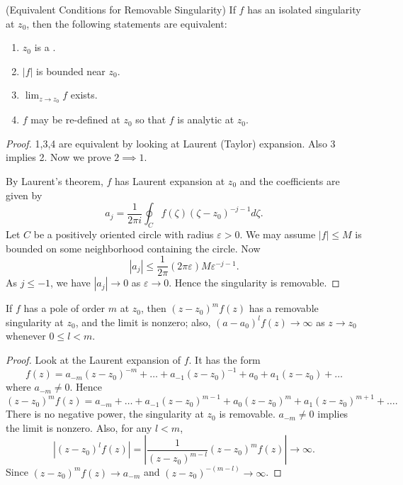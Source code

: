 \begin{theorem}(Equivalent Conditions for Removable Singularity)
	If $f$ has an isolated singularity at $z_0$, then the following statements are equivalent:
	\begin{enumerate}
		\item $z_0$ is a .
		\item $|f|$ is bounded near $z_0$.
		\item $\lim_{z \to z_0} f$ exists.
		\item $f$ may be re-defined at $z_0$ so that $f$ is analytic at $z_0$.
	\end{enumerate}
\end{theorem}
\begin{proof}
	1,3,4 are equivalent by looking at Laurent (Taylor) expansion. Also 3 implies 2. Now we prove $2 \implies 1$.

	By Laurent's theorem, $f$ has Laurent expansion at $z_0$ and the coefficients are given by
	\[
		a_j = \frac{1}{2 \pi i} \oint_C f(\zeta) (\zeta - z_0)^{-j-1} d \zeta
	.\] 
	Let $C$ be a positively oriented circle with radius $\varepsilon>0$. We may assume $|f|\le M$ is bounded on some neighborhood containing the circle. Now
	\[
		|a_j| \le \frac{1}{2 \pi} (2 \pi \varepsilon) M \varepsilon^{-j-1}
	.\] 
	As $j\le -1$, we have $|a_j| \to 0$ as $\varepsilon \to 0$. Hence the singularity is removable.
\end{proof}

\begin{lemma}
	If $f$ has a pole of order $m$ at $z_0$, then $(z-z_0)^m f(z)$ has a removable singularity at $z_0$, and the limit is nonzero; also, $(a-a_0)^l f(z) \to  \infty $ as $z \to z_0$ whenever $0 \le  l < m$.
\end{lemma}
\begin{proof}
	Look at the Laurent expansion of $f$. It has the form
	\[
		f(z) = a_{-m}(z-z_0)^{-m} + \ldots + a_{-1}(z-z_0)^{-1} + a_0 + a_1 (z-z_0) + \ldots
	\] 
	where $a_{-m}\neq 0$.
	Hence
\[
	(z-z_0)^m f(z) = a_{-m} + \ldots + a_{-1}(z-z_0)^{m-1} + a_0(z-z_0)^m + a_1 (z-z_0)^{m+1} + \ldots
	.\]
	There is no negative power, the singularity at $z_0$ is removable. $a_{-m}\neq 0$ implies the limit is nonzero. Also, for any $l < m$,
	\[
		\left| (z-z_0)^l f(z) \right| =  \left| \frac{1}{(z-z_0)^{m - l}} (z-z_0)^m f(z) \right| \to  \infty 
	.\] 
	Since $(z-z_0)^m f(z) \to a_{-m}$ and $(z-z_0)^{-(m-l)} \to \infty $.
\end{proof}

